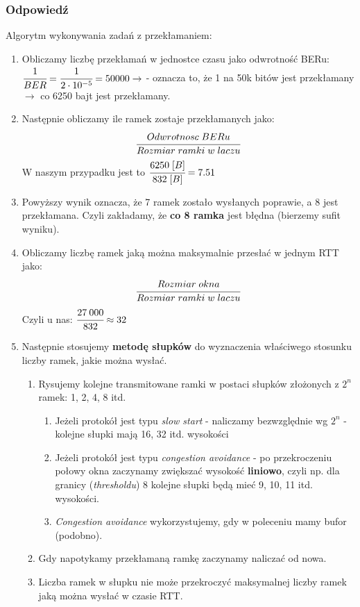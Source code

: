 		\subsubsection{Odpowiedź}
			Algorytm wykonywania zadań z przekłamaniem:
			\begin{enumerate}
				\item Obliczamy liczbę przekłamań w jednostce czasu jako odwrotność BERu:
				$ \cfrac{1}{BER} = \cfrac{1}{2\cdot 10^{-5}}=50000 \rightarrow$ - oznacza to, że 1 na 50k bitów jest przekłamany $ \rightarrow $ co 6250 bajt jest przekłamany.
				\item Następnie obliczamy ile ramek zostaje przekłamanych jako:
				$$ \cfrac{Odwrotnosc\;BERu}{Rozmiar\;ramki\;w\;laczu} $$
				W naszym przypadku jest to $ \cfrac{6250\;[B]}{832\;[B]}=7.51$
				\item Powyższy wynik oznacza, że 7 ramek zostało wysłanych poprawie, a 8 jest przekłamana. Czyli zakładamy, że \textbf{co 8 ramka} jest błędna (bierzemy sufit wyniku).
				\item Obliczamy liczbę ramek jaką można maksymalnie przesłać w jednym RTT jako:
				$$ \cfrac{Rozmiar\;okna}{Rozmiar\;ramki\;w\;laczu} $$
				Czyli u nas: $ \cfrac{27\:000}{832}\approx32 $
				\item Następnie stosujemy \textbf{metodę słupków} do wyznaczenia właściwego stosunku liczby ramek, jakie można wysłać.
				\begin{enumerate}
					\item Rysujemy kolejne transmitowane ramki w postaci słupków złożonych z $ 2^n $ ramek: 1, 2, 4, 8 itd.
					\begin{enumerate}
						\item Jeżeli protokół jest typu \emph{slow start} - naliczamy bezwzględnie wg $ 2^n $ - kolejne słupki mają 16, 32 itd. wysokości
						\item Jeżeli protokół jest typu \emph{congestion avoidance} - po przekroczeniu połowy okna zaczynamy zwiększać wysokość \textbf{liniowo}, czyli np. dla granicy (\emph{thresholdu}) 8 kolejne słupki będą mieć 9, 10, 11 itd. wysokości.
						\item \emph{Congestion avoidance} wykorzystujemy, gdy w poleceniu mamy bufor (podobno).
					\end{enumerate}
					\item Gdy napotykamy przekłamaną ramkę zaczynamy naliczać od nowa.
					\item Liczba ramek w słupku nie może przekroczyć maksymalnej liczby ramek jaką można wysłać w czasie RTT.

\end{enumerate}
\end{enumerate}
